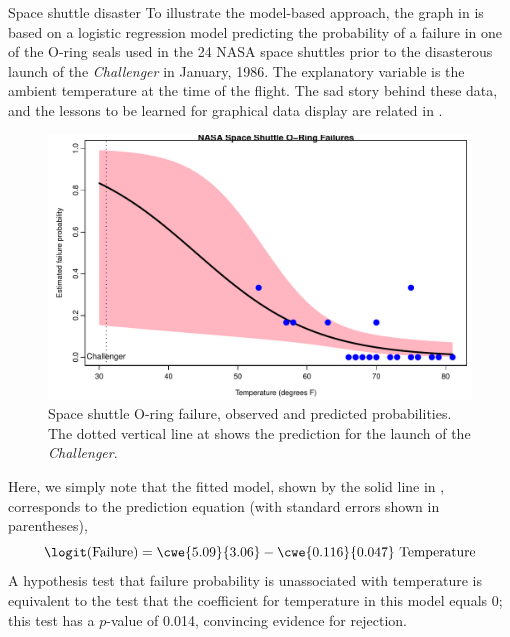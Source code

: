 \documentclass[11pt]{book}\usepackage[]{graphicx}\usepackage[]{color}
\newenvironment{knitrout}{}{} %
\renewenvironment{knitrout}{\small\renewcommand{\baselinestretch}{.85}}{} %
\begin{document}
\begin{Example}[nasa0]{Space shuttle disaster}
To illustrate the model-based approach,
the graph in  is based on
a logistic regression model predicting the probability of a
failure in one of the O-ring seals used in the 24 NASA space shuttles
prior to the disasterous launch of the 
\emph{Challenger} in January, 1986.  The explanatory variable is the ambient temperature at the time of the flight.
The sad story behind these data, and the lessons to be learned for
graphical data display are related in .

\begin{knitrout}
\color{fgcolor}\begin{figure}[htbp]


\centerline{\includegraphics[width=.7\textwidth]{ch01/fig/spaceshuttle0} }

\caption[Space shuttle O-ring failure, observed and predicted probabilities]{Space shuttle O-ring failure, observed and predicted probabilities. The dotted vertical line at  shows the prediction for the launch of the \emph{Challenger}.\label{fig:spaceshuttle0}}
\end{figure}


\end{knitrout}


Here, we simply note that the fitted model, shown by the solid line in
, corresponds to the prediction equation
(with standard errors shown in parentheses),
\begin{equation*}
 \logit ( \mbox{Failure} ) =  \cwe{5.09}{3.06} - \cwe{0.116}{0.047} \mbox{ Temperature} 
 \end{equation*}%
A hypothesis test that failure probability is unassociated with temperature
is equivalent to the test that the coefficient for temperature in this
model equals 0; this test has a $p$-value of 0.014, convincing evidence
for rejection.


\end{Example}
\end{document}

